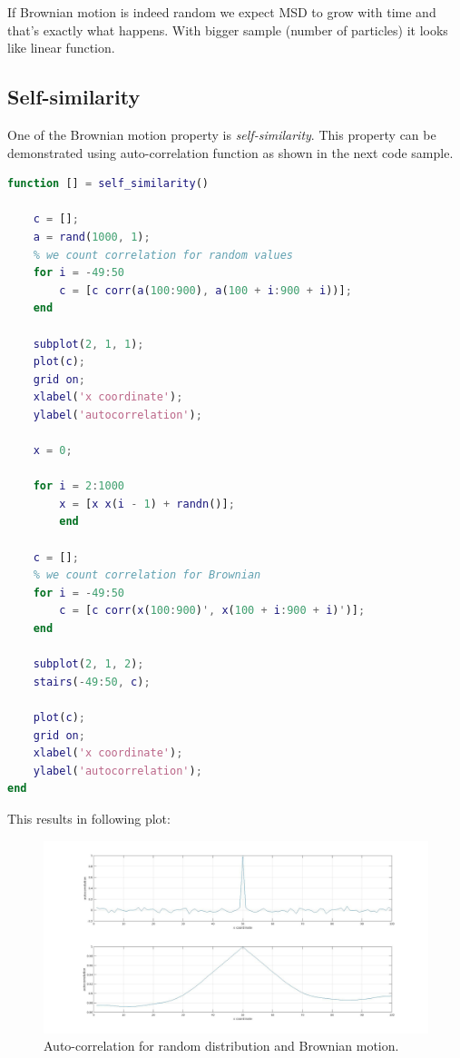 \documentclass[12pt]{article}
\begin{document}
If Brownian motion is indeed random we expect MSD to grow with time and that's exactly what happens. With bigger sample (number of particles) it looks like linear function.

\subsection{Self-similarity}
One of the Brownian motion property is \textit{self-similarity}. This property can be demonstrated using auto-correlation function as shown in the next code sample.

\begin{lstlisting}[language=Matlab, caption = {Source code for auto-correlation}]
function [] = self_similarity()

	c = [];
	a = rand(1000, 1);
	% we count correlation for random values
	for i = -49:50
		c = [c corr(a(100:900), a(100 + i:900 + i))];
	end

	subplot(2, 1, 1);
	plot(c);
	grid on;
	xlabel('x coordinate');
	ylabel('autocorrelation');

	x = 0;

	for i = 2:1000
		x = [x x(i - 1) + randn()];
		end

	c = [];
	% we count correlation for Brownian
	for i = -49:50
		c = [c corr(x(100:900)', x(100 + i:900 + i)')];
	end

	subplot(2, 1, 2);
	stairs(-49:50, c);

	plot(c);
	grid on;
	xlabel('x coordinate');
	ylabel('autocorrelation');
end
\end{lstlisting}

This results in following plot:

\begin{figure}[H]
	\centering
	\includegraphics[width=1.2\textwidth]{auto_corr}
	\caption{Auto-correlation for random distribution and Brownian motion.}
\end{figure}
\end{document}
